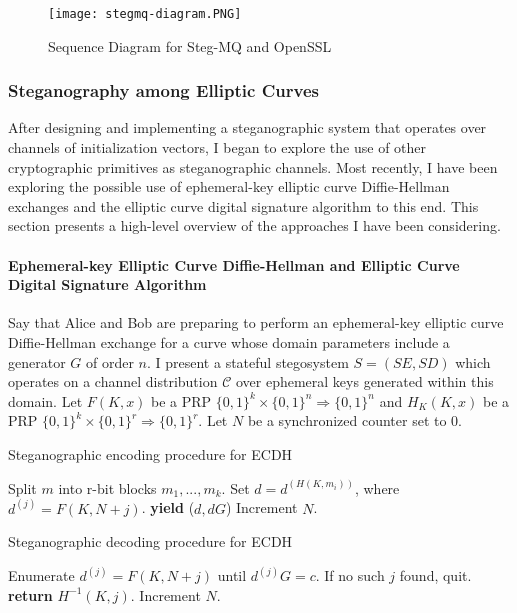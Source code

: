 \documentclass{article}
\begin{document}
\begin{figure}[H]
\centering
\caption{Sequence Diagram for Steg-MQ and OpenSSL}
\texttt{[image: stegmq-diagram.PNG]}
\end{figure}

\subsubsection{Steganography among Elliptic Curves}

After designing and implementing a steganographic system that operates over channels of initialization vectors, 
I began to explore the use of other cryptographic primitives as steganographic channels.  Most recently, I have been 
exploring the possible use of ephemeral-key elliptic curve Diffie-Hellman exchanges and the elliptic curve digital 
signature algorithm to this end.  This section presents a high-level overview of the approaches I have been considering.

\paragraph{Ephemeral-key Elliptic Curve Diffie-Hellman and Elliptic Curve Digital Signature Algorithm}

Say that Alice and Bob are preparing to perform an ephemeral-key elliptic curve Diffie-Hellman exchange for a curve 
whose domain parameters include a generator $G$ of order $n$.  I present a stateful stegosystem $S = (SE,SD)$ which operates on a 
channel distribution $\mathcal{C}$ over ephemeral keys generated within this domain.  Let 
$F(K,x)$ be a PRP $\{0,1\}^k \times \{0,1\}^n \Rightarrow \{0,1\}^n$ and $H_K(K,x)$ be a PRP $\{0,1\}^k \times \{0,1\}^r \Rightarrow \{0,1\}^r$.  
Let $N$ be a synchronized counter set to 0.

\begin{algorithm}[H]
\caption{Steganographic encoding procedure for ECDH}\label{1a}
\begin{algorithmic}[1]
\State Split $m$ into r-bit blocks $m_1,...,m_k$.
\State Set $d = d^{(H(K,m_i))}$, where $d^{(j)}=F(K,N+j)$.
\State \textbf{yield} ($d,dG$)
\State Increment $N$.
\EndFor
\EndProcedure
\end{algorithmic}
\end{algorithm}

\begin{algorithm}[H]
\caption{Steganographic decoding procedure for ECDH}\label{1a}
\begin{algorithmic}[1]
\State Enumerate $d^{(j)}=F(K,N+j)$ until $d^{(j)}G = c$.
\State If no such $j$ found, quit.
\State \textbf{return} $H^{-1}(K,j)$. 
\State Increment $N$.
\EndProcedure
\end{algorithmic}
\end{algorithm}
\end{document}
